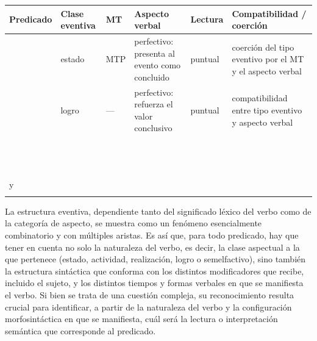 \begin{ejercicio}
{\footnotesize
\begin{tabularx}{\linewidth}{@{}>{\raggedright\arraybackslash}p{19mm}
    >{\raggedright\arraybackslash}p{13mm} L L
    >{\raggedright\arraybackslash}p{10mm} L@{}}
  \toprule
  Predicado & Clase eventiva & MT & Aspecto verbal & Lectura &
    Compatibilidad / coerción \\
  \midrule
   & estado & MTP  &
    perfectivo: presenta al evento como concluido & puntual & coerción del tipo
    eventivo por el MT y el aspecto verbal \\
   & logro & --- & perfectivo: refuerza el
    valor conclusivo & puntual & compatibilidad entre tipo eventivo y aspecto
    verbal \\
   & & & & & \\
   & & & & & \\
   & & & & & \\
   & & & & & \\
   & & & & & \\
   & & & & & \\
   & & & & & \\
   & & & & & \\
   & & & & & \\
   & & & & & \\
   & & & & & \\
   & & & & & \\
   & & & & & \\
   y  & & & & & \\
   & & & & & \\
  \bottomrule
\end{tabularx}}
\end{ejercicio}

\begin{recuadro}
La estructura eventiva, dependiente tanto del significado léxico del verbo como
de la categoría de aspecto, se muestra como un fenómeno esencialmente
combinatorio y con múltiples aristas. Es así que, para todo predicado, hay que
tener en cuenta no solo la naturaleza del verbo, es decir, la clase aspectual a
la que pertenece (estado, actividad, realización, logro o semelfactivo), sino
también la estructura sintáctica que conforma con los distintos modificadores
que recibe, incluido el sujeto, y los distintos tiempos y formas verbales en que
se manifiesta el verbo. Si bien se trata de una cuestión compleja, su
reconocimiento resulta crucial para identificar, a partir de la naturaleza del
verbo y la configuración morfosintáctica en que se manifiesta, cuál será la
lectura o interpretación semántica que corresponde al predicado.
\end{recuadro}

